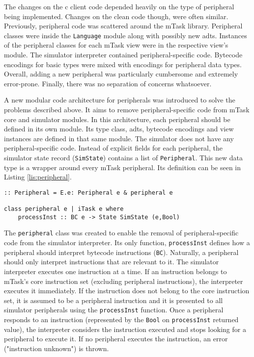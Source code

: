 The changes on the \gls{c} client code depended heavily on the type of peripheral being implemented. Changes on the \gls{clean} code though, were often similar. Previously, peripheral code was scattered around the \gls{mTask} library. Peripheral classes were inside the \texttt{Language} module along with possibly new \acsp{adt}. Instances of the peripheral classes for each \gls{mTask} view were in the respective view's module. The simulator interpreter contained peripheral-specific code. Bytecode encodings for basic types were mixed with encodings for peripheral data types. Overall, adding a new peripheral was particularly cumbersome and extremely error-prone. Finally, there was no separation of concerns whatsoever.

A new modular code architecture for peripherals was introduced to solve the problems described above. It aims to remove peripheral-specific code from \gls{mTask} core and simulator modules. In this architecture, each peripheral should be defined in its own module. Its type class, \acsp{adt}, bytecode encodings and view instances are defined in that same module. The simulator does not have any peripheral-specific code. Instead of explicit fields for each peripheral, the simulator state record (\texttt{SimState}) contains a list of \texttt{Peripheral}. This new data type is a wrapper around every \gls{mTask} peripheral. Its definition can be seen in Listing \ref{lis:peripheral}. 

\begin{lstlisting}[caption=The \texttt{Peripheral} class,captionpos=b,label=lis:peripheral]
:: Peripheral = E.e: Peripheral e & peripheral e

class peripheral e | iTask e where
	processInst :: BC e -> State SimState (e,Bool)
\end{lstlisting}

The \texttt{peripheral} class was created to enable the removal of peripheral-specific code from the simulator interpreter. Its only function, \texttt{processInst} defines how a peripheral should interpret bytecode instructions (\texttt{BC}). Naturally, a peripheral should only interpret instructions that are relevant to it. The simulator interpreter executes one instruction at a time. If an instruction belongs to \gls{mTask}'s core instruction set (excluding peripheral instructions), the interpreter executes it immediately. If the instruction does not belong to the core instruction set, it is assumed to be a peripheral instruction and it is presented to all simulator peripherals using the \texttt{processInst} function. Once a peripheral responds to an instruction (represented by the \texttt{Bool} on \texttt{processInst} returned value), the interpreter considers the instruction executed and stops looking for a peripheral to execute it. If no peripheral executes the instruction, an error ("instruction unknown") is thrown. 

